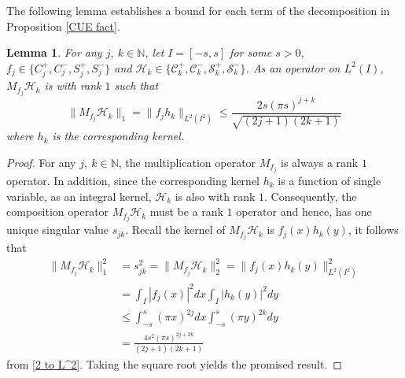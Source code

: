 \documentclass[11pt]{article}
\newtheorem{lemma}[theorem]{Lemma}
\numberwithin{equation}{section}%
\numberwithin{theorem}{section}
\begin{document}
The following lemma establishes a bound for each term of the decomposition in Proposition \ref{CUE fact}.
\begin{lemma}\label{b4cs}
    For any $j,~k\in\mathbb{N}$, let $I=[-s,s]$ for some $s>0$, $f_j\in\{C_j^+,C_j^-,S_j^+,S_j^-\}$ and $\mathcal{H}_k\in\{\mathcal{C}_k^+,\mathcal{C}_k^-,\mathcal{S}_k^+,\mathcal{S}_k^-\}$. As an operator on $L^2(I)$, $M_{f_j}\mathcal{H}_k$ is with rank $1$ such that
    \begin{equation*}
        \|M_{f_j}\mathcal{H}_k\|_1=\|f_jh_k\|_{L^2(I^2)}\le\frac{2s(\pi s)^{j+k}}{\sqrt{(2j+1)(2k+1)}}
    \end{equation*}
    where $h_k$ is the corresponding kernel.
\end{lemma}
\begin{proof}
For any $j,~k\in\mathbb{N}$, the multiplication operator $M_{f_j}$ is always a rank $1$ operator. In addition, since the corresponding kernel $h_k$ is a function of single variable, as an integral kernel, $\mathcal{H}_k$ is also with rank $1$. Consequently, the composition operator $M_{f_j}\mathcal{H}_k$ must be a rank $1$ operator and hence, has one unique singular value $s_{jk}$. Recall the kernel of $M_{f_j}\mathcal{H}_k$ is $f_j(x)h_k(y)$, it follows that
\begin{equation*}
    \begin{split}
\|M_{f_j}\mathcal{H}_k\|^2_1&=s^2_{jk}=\|M_{f_j}\mathcal{H}_k\|_2^2=\|f_j(x)h_k(y)\|^2_{L^2(I^2)}\\&=\int_I|f_j(x)|^2dx\int_I|h_k(y)|^2dy\\
&\le\int_{-s}^s(\pi x)^{2j}dx\int_{-s}^s(\pi y)^{2k}dy\\
&=\frac{4s^2(\pi s)^{2j+2k}}{(2j+1)(2k+1)}
    \end{split}
\end{equation*}
from \eqref{2 to L^2}. Taking the square root yields the promised result.
\end{proof}
\end{document}
